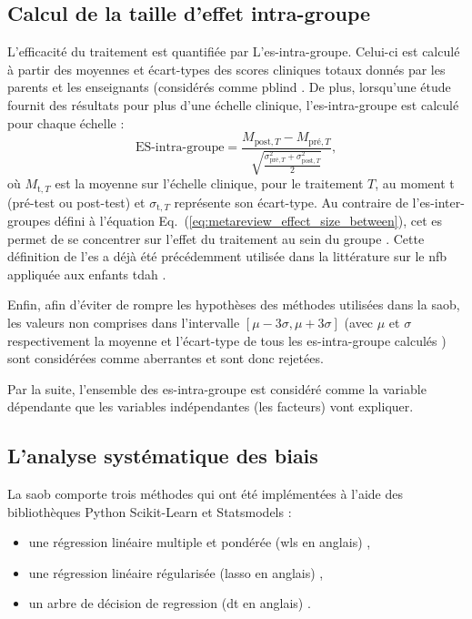\subsection{Calcul de la taille d'effet intra-groupe}

L'efficacité du traitement est quantifiée par L'\gls{es}-intra-groupe. Celui-ci est calculé à partir des moyennes et écart-types des scores 
cliniques totaux donnés par les parents et les enseignants (considérés comme \gls{pblind} \citep{Cortese2016, Micoulaud2014}. De plus, lorsqu'une étude 
fournit des résultats pour plus d'une échelle clinique, l'\gls{es}-intra-groupe est calculé pour chaque échelle :
\begin{equation}
\label{eq:factors_effect_size_within_subject}
\text{ES-intra-groupe} = \frac{M_{\text{post},T} - M_{\text{pré},T}}{\sqrt{\frac{\sigma_{\text{pré},T}^2 + \sigma_{\text{post},T}^2}{2}}},
\end{equation} 
\noindent où $M_{\text{t},T}$ est la moyenne sur l'échelle clinique, pour le traitement $T$, au moment t (pré-test ou post-test) et $\sigma_{\text{t},T}$ représente
son écart-type. Au contraire de l'\gls{es}-inter-groupes défini à l'équation Eq.~(\ref{eq:metareview_effect_size_between}), cet \gls{es} permet de se concentrer sur l'effet du 
traitement au sein du groupe \citep{Cohen1988}. Cette définition de l'\gls{es} a déjà été précédemment utilisée dans la littérature sur le \gls{nfb} 
appliquée aux enfants \gls{tdah} \citep{Arns2009, Maurizio2014, Strehl2017}. 

Enfin, afin d'éviter de rompre les hypothèses des méthodes utilisées dans la \gls{saob}, les valeurs non comprises dans l'intervalle 
$[\mu - 3 \sigma, \mu + 3 \sigma]$ (avec $\mu$ et $\sigma$ respectivement la moyenne et l'écart-type de tous les \gls{es}-intra-groupe calculés \citep{Shewhart1931})
sont considérées comme aberrantes et sont donc rejetées.

Par la suite, l'ensemble des \gls{es}-intra-groupe est considéré comme la variable dépendante que les variables indépendantes (les facteurs) vont expliquer. 

\subsection{L'analyse systématique des biais}

La \gls{saob} comporte trois méthodes qui ont été implémentées à l'aide des bibliothèques Python Scikit-Learn \citep[version 0.18.1]{Pedregosa2011} et Statsmodels \citep[version 0.8.0]{Seabold2010} : 
\begin{itemize}
  \item une régression linéaire multiple et pondérée (\gls{wls} en anglais) \citep{Montgomery2012},
	\item une régression linéaire régularisée (\gls{lasso} en anglais) \citep{Tibshirani1996},
	\item un arbre de décision de regression (\gls{dt} en anglais) \citep{Quinlan1986}.
\end{itemize}

